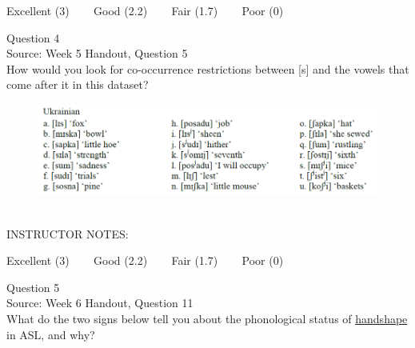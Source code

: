 \documentclass[12pt]{article}
\begin{document}
\vfill
Excellent (3) ~~~ Good (2.2) ~~~ Fair (1.7) ~~~ Poor (0)
\newpage

{\large Question 4}\\

Source: Week 5 Handout, Question 5\\

How would you look for co-occurrence restrictions between [s] and the vowels that come after it in this dataset?\\

\begin{figure}[H]
\includegraphics{../images/ukrainian.png}
\end{figure}

~\\
INSTRUCTOR NOTES: 


\vfill
Excellent (3) ~~~ Good (2.2) ~~~ Fair (1.7) ~~~ Poor (0)
\newpage

{\large Question 5}\\

Source: Week 6 Handout, Question 11\\

What do the two signs below tell you about the phonological status of \underline{handshape} in ASL, and why?\\
\end{document}
